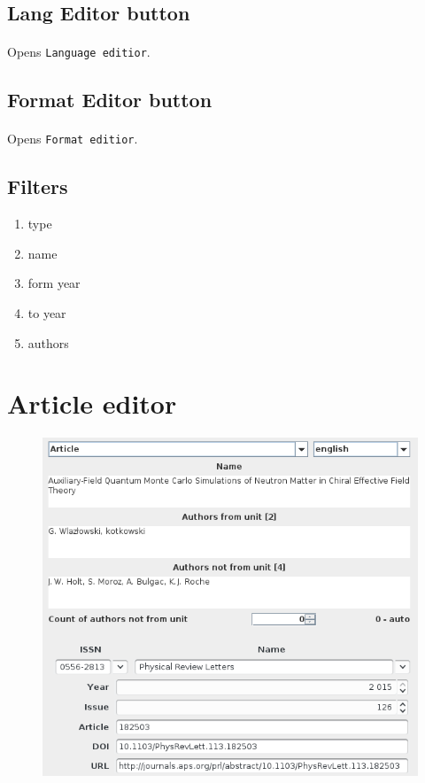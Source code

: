 \documentclass[a4paper,10pt]{article}
\begin{document}
\subsection{Lang Editor button}
\paragraph{}Opens \texttt{Language editior}.
\subsection{Format Editor button}
\paragraph{}Opens \texttt{Format editior}.
\subsection{Filters}
\begin{enumerate}
 \item type
 \item name
 \item form year
 \item to year
 \item authors
\end{enumerate}

\section{Article editor}
\begin{figure}[H]
 \centering
 \includegraphics[width=35em]{kpub-article.png}
\end{figure}
\end{document}
